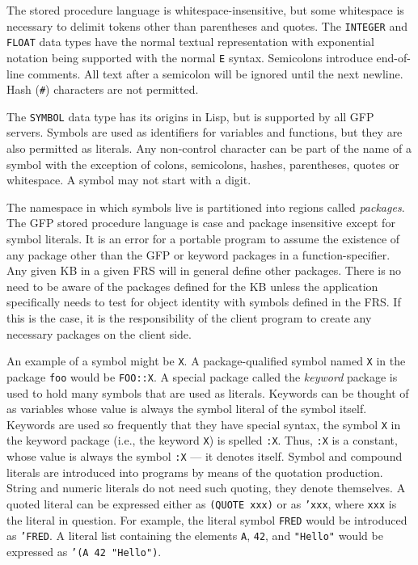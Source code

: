 The stored procedure language is whitespace-insensitive, but some
whitespace is necessary to delimit tokens other than parentheses and
quotes.  The {\tt INTEGER} and {\tt FLOAT} data types have the normal
textual representation with exponential notation being supported with
the normal {\tt E} syntax.  Semicolons introduce end-of-line
comments.  All text after a semicolon will be ignored until the next
newline.  Hash ({\tt \#}) characters are not permitted.

The {\tt SYMBOL} data type has its origins in Lisp, but is supported
by all GFP servers.  Symbols are used as identifiers for variables and
functions, but they are also permitted as literals.  Any non-control
character can be part of the name of a symbol with the exception of
colons, semicolons, hashes, parentheses, quotes or whitespace.  A
symbol may not start with a digit.

The namespace in which symbols live is partitioned into regions called
{\em packages}.  The GFP stored procedure language is case and package
insensitive except for symbol literals.  It is an
error for a portable program to assume the existence of any package
other than the GFP or keyword packages in a function-specifier.  Any
given KB in a given FRS will in general define other packages.  There
is no need to be aware of the packages defined for the KB unless the
application specifically needs to test for object identity with
symbols defined in the FRS.  If this is the case, it is the
responsibility of the client program to create any necessary packages
on the client side.

An example of a symbol might be {\tt X}.  A package-qualified symbol
named {\tt X} in the package {\tt foo} would be {\tt FOO::X}.  A
special package called the {\em keyword} package is used to hold many
symbols that are used as literals.  Keywords can be thought of as
variables whose value is always the symbol literal of the symbol
itself.  Keywords are used so frequently that they have special
syntax, the symbol {\tt X} in the keyword package (i.e., the keyword
{\tt X}) is spelled {\tt :X}.  Thus, {\tt :X} is a constant, whose
value is always the symbol {\tt :X} --- it denotes itself.  Symbol and
compound literals are introduced into programs by means of the
quotation production.  String and numeric literals do not need such
quoting, they denote themselves.  A quoted literal can be expressed
either as {\tt (QUOTE xxx)} or as {\tt 'xxx}, where {\tt xxx} is the
literal in question.  For example, the literal symbol {\tt FRED} would
be introduced as {\tt 'FRED}.  A literal list containing the elements
{\tt A}, {\tt 42}, and {\tt "Hello"} would be expressed as {\tt '(A 42
"Hello")}.

